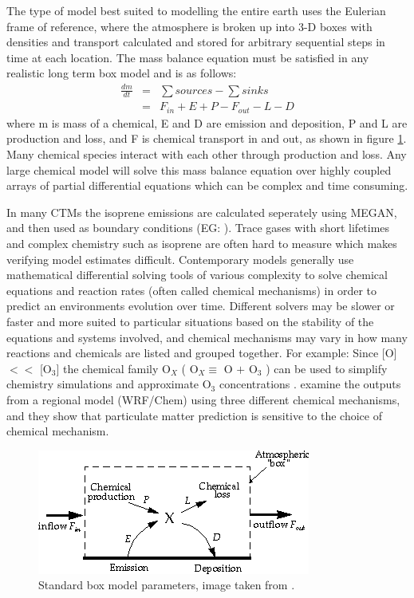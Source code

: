     
    The type of model best suited to modelling the entire earth uses the Eulerian frame of reference, where the atmosphere is broken up into 3-D boxes with densities and transport calculated and stored for arbitrary sequential steps in time at each location.
    The mass balance equation must be satisfied in any realistic long term box model and is as follows: 
    \begin{align*}
      \frac{dm}{dt} &=& \sum{sources}-\sum{sinks} \\
      &=& F_{in} + E + P - F_{out} - L - D 
    \end{align*}
    where m is mass of a chemical, E and D are emission and deposition, P and L are production and loss, and F is chemical transport in and out, as shown in figure \ref{LR:fig:boxmodel}.
    Many chemical species interact with each other through production and loss. 
    Any large chemical model will solve this mass balance equation over highly coupled arrays of partial differential equations which can be complex and time consuming.
    
    In many CTMs the isoprene emissions are calculated seperately using MEGAN, and then used as boundary conditions (EG: \citet{Guenther2006}).
    Trace gases with short lifetimes and complex chemistry such as isoprene are often hard to measure which makes verifying model estimates difficult.
    Contemporary models generally use mathematical differential solving tools of various complexity to solve chemical equations and reaction rates (often called chemical mechanisms) in order to predict an environments evolution over time.
    Different solvers may be slower or faster and more suited to particular situations based on the stability of the equations and systems involved, and chemical mechanisms may vary in how many reactions and chemicals are listed and grouped together.
    For example: Since [O] $<<$ [O$_3$] the chemical family O$_X$ (  O$_X \equiv $ O $+$ O$_3$ ) can be used to simplify chemistry simulations and approximate O$_3$ concentrations \citep[][Chapter 3]{BrasseurJacob2017}.
    \cite{Zhang2012} examine the outputs from a regional model (WRF/Chem) using three different chemical mechanisms, and they show that particulate matter prediction is sensitive to the choice of chemical mechanism.
    
    \begin{figure}
      \includegraphics{Figures/boxmodel.png}
      \caption{ Standard box model parameters, image taken from \citet{Jacob_1999_book}. }
      \label{LR:fig:boxmodel}
    \end{figure}
    
